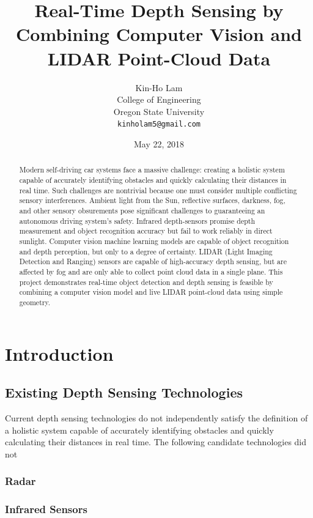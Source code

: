 \documentclass{article}
\title{Real-Time Depth Sensing by Combining Computer Vision and LIDAR Point-Cloud Data}
\date{May 22, 2018}
\author{
  Kin-Ho Lam\\
  College of Engineering\\
  Oregon State University \\
  \texttt{kinholam5@gmail.com}\\
}
\begin{document}
\maketitle

\begin{abstract}
  Modern self-driving car systems face a massive challenge: creating a holistic system capable of accurately identifying obstacles and quickly calculating their distances in real time.
  Such challenges are nontrivial because one must consider multiple conflicting sensory interferences.
  Ambient light from the Sun, reflective surfaces, darkness, fog, and other sensory obsurements pose significant challenges to guaranteeing an autonomous driving system's safety.
  Infrared depth-sensors promise depth measurement and object recognition accuracy but fail to work reliably in direct sunlight.
  Computer vision machine learning models are capable of object recognition and depth perception, but only to a degree of certainty.
  LIDAR (Light Imaging Detection and Ranging) sensors are capable of high-accuracy depth sensing, but are affected by fog and are only able to collect point cloud data in a single plane.
  This project demonstrates real-time object detection and depth sensing is feasible by combining a computer vision model and live LIDAR point-cloud data using simple geometry.
\end{abstract}


\section{Introduction}
    \subsection{Existing Depth Sensing Technologies}
      Current depth sensing technologies do not independently satisfy the definition of a holistic system capable of accurately identifying obstacles and quickly calculating their distances in real time.
      The following candidate technologies did not 

    \subsubsection{Radar}

    \subsubsection{Infrared Sensors}
\end{document}
